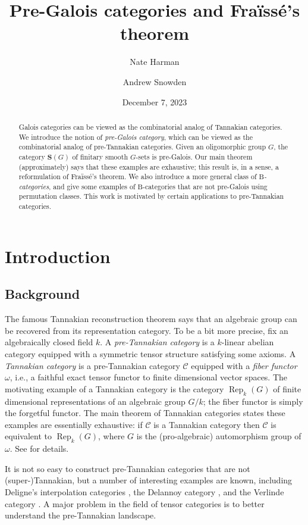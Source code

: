 \documentclass[12pt]{amsart}
\title{Pre-Galois categories and Fra\"iss\'e's theorem}
\author{Nate Harman}
\author{Andrew Snowden}
\date{December 7, 2023}
\numberwithin{equation}{section}
\theoremstyle{definition}
\newcommand{\rB}{\mathrm{B}}
\newcommand{\cC}{\mathcal{C}}
\newcommand{\bS}{\mathbf{S}}
\newcommand{\defn}[1]{\emph{#1}}
\DeclareMathOperator{\Rep}{Rep}
\begin{document}
\begin{abstract}
Galois categories can be viewed as the combinatorial analog of Tannakian categories. We introduce the notion of \defn{pre-Galois category}, which can be viewed as the combinatorial analog of pre-Tannakian categories. Given an oligomorphic group $G$, the category $\bS(G)$ of finitary smooth $G$-sets is pre-Galois. Our main theorem (approximately) says that these examples are exhaustive; this result is, in a sense, a reformulation of Fra\"iss\'e's theorem. We also introduce a more general class of \defn{$\rB$-categories}, and give some examples of $\rB$-categories that are not pre-Galois using permutation classes. This work is motivated by certain applications to pre-Tannakian categories.
\end{abstract}

\maketitle
\tableofcontents

\section{Introduction}

\subsection{Background}

The famous Tannakian reconstruction theorem says that an algebraic group can be recovered from its representation category. To be a bit more precise, fix an algebraically closed field $k$. A \defn{pre-Tannakian category} is a $k$-linear abelian category equipped with a symmetric tensor structure satisfying some axioms. A \defn{Tannakian category} is a pre-Tannakian category $\cC$ equipped with a \defn{fiber functor} $\omega$, i.e., a faithful exact tensor functor to finite dimensional vector spaces. The motivating example of a Tannakian category is the category $\Rep_k(G)$ of finite dimensional representations of an algebraic group $G/k$; the fiber functor is simply the forgetful functor. The main theorem of Tannakian categories states these examples are essentially exhaustive: if $\cC$ is a Tannakian category then $\cC$ is equivalent to $\Rep_k(G)$, where $G$ is the (pro-algebraic) automorphism group of $\omega$. See \cite{DeligneMilne} for details.

It is not so easy to construct pre-Tannakian categories that are not (super-)Tannakian, but a number of interesting examples are known, including Deligne's interpolation categories \cite{Deligne3}, the Delannoy category \cite{line}, and the Verlinde category \cite{Ostrik}. A major problem in the field of tensor categories is to better understand the pre-Tannakian landscape.
\end{document}

